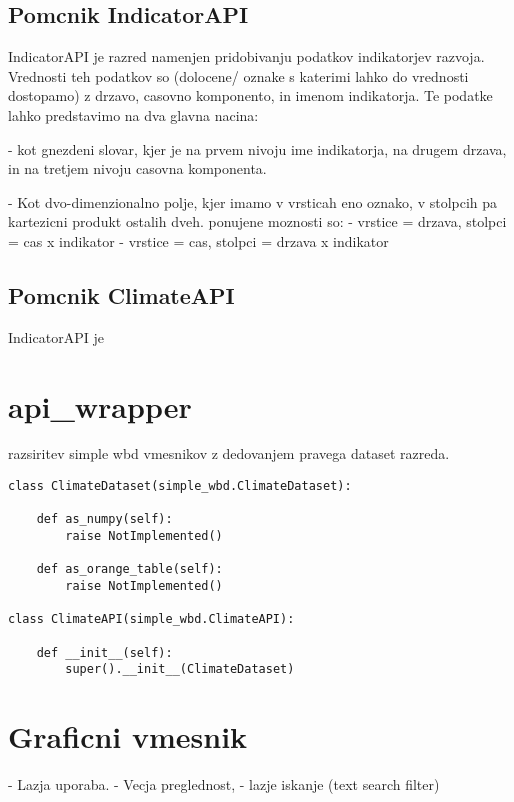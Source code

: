 \subsection{Pomcnik IndicatorAPI}

IndicatorAPI je razred namenjen pridobivanju podatkov indikatorjev razvoja.
Vrednosti teh podatkov so (dolocene/ oznake s katerimi lahko do vrednosti
dostopamo) z drzavo, casovno komponento, in imenom indikatorja. Te podatke
lahko predstavimo na dva glavna nacina:

 - kot gnezdeni slovar, kjer je na prvem nivoju ime indikatorja, na drugem
   drzava, in na tretjem nivoju casovna komponenta.

 - Kot dvo-dimenzionalno polje, kjer imamo v vrsticah eno oznako, v stolpcih
   pa kartezicni produkt ostalih dveh. ponujene moznosti so:
   - vrstice = drzava, stolpci = cas x indikator
   - vrstice = cas, stolpci = drzava x indikator




% 
% 
% 
% 
% 
% 




\subsection{Pomcnik ClimateAPI}

IndicatorAPI je 



% 
% 



\section{api\_wrapper}



razsiritev simple wbd vmesnikov z dedovanjem pravega dataset razreda.

\begin{verbatim}
class ClimateDataset(simple_wbd.ClimateDataset):
    
    def as_numpy(self):
        raise NotImplemented()
    
    def as_orange_table(self):
        raise NotImplemented()

class ClimateAPI(simple_wbd.ClimateAPI):

    def __init__(self):
        super().__init__(ClimateDataset)
\end{verbatim}





\section{Graficni vmesnik}


- Lazja uporaba.
- Vecja preglednost,
- lazje iskanje (text search filter)
